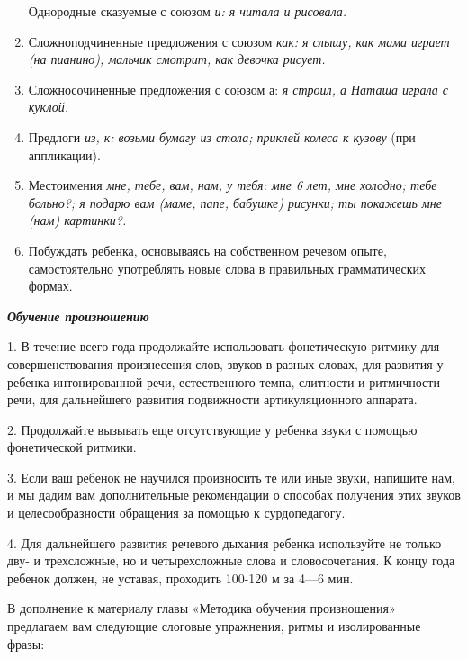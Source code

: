 \documentclass{book}
\renewcommand{\emph}[1]{\textit{#1}}
\begin{document}
\begin{enumerate}
  Однородные сказуемые с союзом \emph{и: я читала и рисовала.}
  
\item
  
  Сложноподчиненные предложения с союзом \emph{как: я слышу, как мама
  играет (на пианино); мальчик смотрит, как девочка рисует.}
  
\item
  
  Сложносочиненные предложения с союзом а: \emph{я строил, а Наташа
  играла с куклой.}
  
\item
  
  Предлоги \emph{из, к: возьми бумагу из стола; приклей колеса к кузову}
  (при аппликации).
  
\item
  
  Местоимения \emph{мне, тебе, вам, нам, у тебя: мне 6 лет, мне холодно;
  тебе больно?; я подарю вам (маме, папе, бабушке) рисунки; ты покажешь
  мне (нам) картинки?.}
  
\item
  
  Побуждать ребенка, основываясь на собственном речевом опыте,
  самостоятельно употреблять новые слова в правильных грамматических
  формах.
  
\end{enumerate}


\emph{\textbf{Обучение произношению}}

1. В течение всего года продолжайте использовать фонетическую ритмику
для совершенствования произнесения слов, звуков в разных словах, для
развития у ребенка интонированной речи, естественного темпа, слитности и
ритмичности речи, для дальнейшего развития подвижности артикуляционного
аппарата.

2. Продолжайте вызывать еще отсутствующие у ребенка звуки с помощью
фонетической ритмики.

3. Если ваш ребенок не научился произносить те или иные звуки, напишите
нам, и мы дадим вам дополнительные рекомендации о способах получения
этих звуков и целесообразности обращения за помощью к сурдопедагогу.

4. Для дальнейшего развития речевого дыхания ребенка используйте не
только дву- и трехсложные, но и четырехсложные слова и словосочетания. К
концу года ребенок должен, не уставая, проходить 100-120 м за 4---6 мин.

В дополнение к материалу главы «Методика обучения произношения»
предлагаем вам следующие слоговые упражнения, ритмы и изолированные
фразы:
\end{document}
